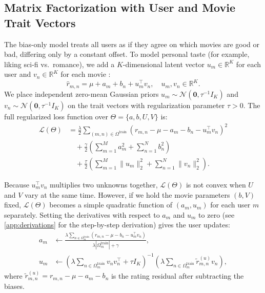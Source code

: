 \documentclass{article}
\theoremstyle{plain}
\theoremstyle{definition}
\begin{document}
\subsection{Matrix Factorization with User and Movie Trait Vectors}
\label{sec:latent_als}

The bias-only model treats all users as if they agree on which movies are good or bad, differing only by a constant offset. To model personal taste (for example, liking sci-fi vs.\ romance), we add a $K$-dimensional latent vector $u_m \in \mathbb{R}^K$ for each user and $v_n \in \mathbb{R}^K$ for each movie \cite{mnih2007probabilistic,koren2009matrix}:
\begin{equation}
    \hat{r}_{m,n} = \mu + a_m + b_n + u_m^\top v_n, \quad u_m, v_n \in \mathbb{R}^K.
    \label{eq:pmf_pred}
\end{equation}
We place independent zero-mean Gaussian priors $u_m \sim \mathcal{N}(\mathbf{0}, \tau^{-1} I_K)$ and $v_n \sim \mathcal{N}(\mathbf{0}, \tau^{-1} I_K)$ on the trait vectors with regularization parameter $\tau > 0$. The full regularized loss function over $\Theta = \{a, b, U, V\}$ is:
\begin{align}
    \mathcal{L}(\Theta) &= \frac{\lambda}{2} \sum_{(m,n) \in \Omega^{\text{train}}} \left(r_{m,n} - \mu - a_m - b_n - u_m^\top v_n\right)^2 \nonumber \\
    &\quad + \frac{\gamma}{2} \left(\sum_{m=1}^M a_m^2 + \sum_{n=1}^N b_n^2\right) \nonumber \\
    &\quad + \frac{\tau}{2} \left(\sum_{m=1}^M \|u_m\|_2^2 + \sum_{n=1}^N \|v_n\|_2^2\right).
    \label{eq:pmf_full_loss}
\end{align}

Because $u_m^\top v_n$ multiplies two unknowns together, $\mathcal{L}(\Theta)$ is not convex when $U$ and $V$ vary at the same time. However, if we hold the movie parameters $(b, V)$ fixed, $\mathcal{L}(\Theta)$ becomes a simple quadratic function of $(a_m, u_m)$ for each user $m$ separately. Setting the derivatives with respect to $a_m$ and $u_m$ to zero (see \cref{app:derivations} for the step-by-step derivation) gives the user updates:
\begin{align}
    a_m &\leftarrow \frac{\lambda \sum_{n \in \Omega_m^{\text{train}}} \left(r_{m,n} - \mu - b_n - u_m^\top v_n\right)}{\lambda |\Omega_m^{\text{train}}| + \gamma}, \label{eq:pmf_user_bias} \\
    u_m &\leftarrow \left(\lambda \sum_{n \in \Omega_m^{\text{train}}} v_n v_n^\top + \tau I_K\right)^{-1} \!\! \left(\lambda \sum_{n \in \Omega_m^{\text{train}}} \tilde{r}_{m,n}^{(u)} v_n\right), \label{eq:pmf_user_vec}
\end{align}
where $\tilde{r}_{m,n}^{(u)} = r_{m,n} - \mu - a_m - b_n$ is the rating residual after subtracting the biases.
\end{document}
